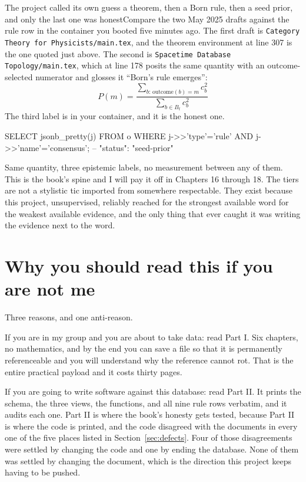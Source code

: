 \begin{Correspondence}{The project called its own guess a theorem, then a Born rule, then a seed prior, and only the last one was honest}{Compare the two May 2025 drafts against the  rule row in the container you booted five minutes ago.}
The first draft is \texttt{Category Theory for Physicists/main.tex}, and the theorem environment at line 307 is the one quoted just above. The second is \texttt{Spacetime Database Topology/main.tex}, which at line 178 posits the same quantity with an outcome-selected numerator and glosses it ``Born's rule emerges'':
\begin{equation*}
P(m) = \frac{\sum_{b:\,\mathrm{outcome}(b)=m} c_b^2}{\sum_{b \in B_t} c_b^2}
\end{equation*}
The third label is in your container, and it is the honest one.
\begin{Check}
SELECT jsonb_pretty(j) FROM o
 WHERE j->>'type'='rule' AND j->>'name'='consensus';   -- "status": "seed-prior"
\end{Check}
Same quantity, three epistemic labels, no measurement between any of them. This is the book's spine and I will pay it off in Chapters 16 through 18. The tiers are not a stylistic tic imported from somewhere respectable. They exist because this project, unsupervised, reliably reached for the strongest available word for the weakest available evidence, and the only thing that ever caught it was writing the evidence next to the word.
\end{Correspondence}

\section{Why you should read this if you are not me}

Three reasons, and one anti-reason.

If you are in my group and you are about to take data: read Part I. Six chapters, no mathematics, and by the end you can save a \labFileFormat{} file so that it is permanently referenceable and you will understand why the reference cannot rot. That is the entire practical payload and it costs thirty pages.

If you are going to write software against this database: read Part II. It prints the schema, the three views, the functions, and all nine rule rows verbatim, and it audits each one. Part II is where the book's honesty gets tested, because Part II is where the code is printed, and the code disagreed with the documents in every one of the five places listed in Section~\ref{sec:defects}. Four of those disagreements were settled by changing the code and one by ending the database. None of them was settled by changing the document, which is the direction this project keeps having to be pushed.

